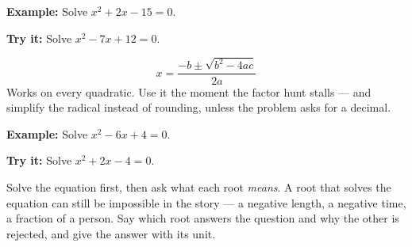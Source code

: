 \documentclass[12pt]{article}
\begin{document}
\begin{examplebox}
\textbf{Example:} \quad Solve $x^2 + 2x - 15 = 0$.
\end{examplebox}

\begin{tryitbox}
\textbf{Try it:} \quad Solve $x^2 - 7x + 12 = 0$.\\[2pt]
\end{tryitbox}


\begin{formulabox}
\[ x = \frac{-b \pm \sqrt{b^2 - 4ac}}{2a} \]
Works on every quadratic. Use it the moment the factor hunt stalls --- and
simplify the radical instead of rounding, unless the problem asks for a decimal.
\end{formulabox}

\begin{examplebox}
\textbf{Example:} \quad Solve $x^2 - 6x + 4 = 0$.
\end{examplebox}

\begin{tryitbox}
\textbf{Try it:} \quad Solve $x^2 + 2x - 4 = 0$.\\[2pt]
\end{tryitbox}


\begin{formulabox}
Solve the equation first, then ask what each root \emph{means}. A root that
solves the equation can still be impossible in the story --- a negative length,
a negative time, a fraction of a person. Say which root answers the question and
why the other is rejected, and give the answer with its unit.
\end{formulabox}
\end{document}
